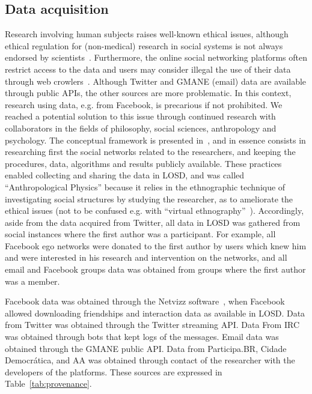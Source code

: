 \documentclass[data,datadescriptor,submit,moreauthors,pdftex]{Definitions/mdpi}
\begin{document}
\subsection{Data acquisition}\label{acq}
Research involving human subjects raises well-known ethical issues,
although ethical regulation for (non-medical) research in social systems
is not always endorsed by scientists~\cite{eth}.
Furthermore, the online social networking platforms often restrict access
to the data and users may consider illegal the use of their data through web crowlers~\cite{ile1,ile2,ile3}.
Although Twitter and GMANE (email) data are available through public APIs,
the other sources are more problematic.
In this context, research using data, e.g. from Facebook, is precarious
if not prohibited.
We reached a potential solution to this issue through continued research with
collaborators in the fields of philosophy, social sciences, anthropology and psychology.
The conceptual framework is presented in~\cite{antphy,antphy2,antphy3}, and in essence
consists in researching first the social networks related to the researchers,
and keeping the procedures, data, algorithms and results publicly available.
These practices enabled collecting and sharing the data in LOSD,
and was called ``Anthropological Physics'' because it relies in the
ethnographic technique of investigating social structures
by studying the researcher, as to ameliorate the ethical issues
(not to be confused e.g. with ``virtual ethnography''~\cite{veth}).
Accordingly, aside from the data acquired from Twitter, all data in LOSD
was gathered from social instances where the first author was a participant.
For example, all Facebook ego networks were donated to the first author by
users which knew him and were interested in his research and intervention on the networks,
and all email and Facebook groups data was obtained from groups where the first author was a member.

Facebook data was obtained through the Netvizz software~\cite{netviz},
when Facebook allowed downloading friendships and interaction data as available in LOSD.
Data from Twitter was obtained through the Twitter streaming API.
Data From IRC was obtained through bots that kept logs of the messages.
Email data was obtained through the GMANE public API.
Data from Participa.BR, Cidade Democrática, and AA was obtained through contact
of the researcher with the developers of the platforms.
These sources are expressed in Table~\ref{tab:provenance}.
\end{document}

